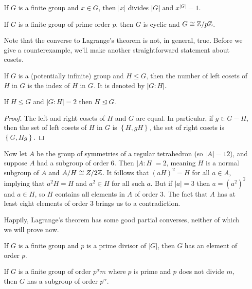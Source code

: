 \documentclass[../m171main.tex]{subfiles}
\begin{document}
\begin{corollary}[]
    If $G$ is a finite group and $x \in G$, then $|x|$ divides $|G|$ and $x^{|G|} = 1$.
\end{corollary}

\begin{corollary}[]
    If $G$ is a finite group of prime order $p$, then $G$ is cyclic and $G \cong \mathbb{Z} / p\mathbb{Z}$.
\end{corollary}

Note that the converse to Lagrange's theorem is not, in general, true.
Before we give a counterexample, we'll make another straightforward statement about cosets.

\begin{definition}
    If $G$ is a (potentially infinite) group and $H \leq G$, then the number of left cosets of $H$ in $G$ is the index of $H$ in $G$.
    It is denoted by $|G : H|$.
\end{definition}

\begin{theorem}[]
    If $H \leq G$ and $|G : H| = 2$ then $H \trianglelefteq G$.
\end{theorem}

\begin{proof}
    The left and right cosets of $H$ and $G$ are equal.
    In particular, if $g \in G - H$, then the set of left cosets of $H$ in $G$ is $\left\{ H, gH \right\}$, the set of right cosets is $\left\{ G, Hg \right\}$.
\end{proof}

Now let $A$ be the group of symmetries of a regular tetrahedron (so $|A| = 12$), and suppose $A$ had a subgroup of order 6.
Then $|A : H| = 2$, meaning $H$ is a normal subgroup of $A$ and $A / H \cong Z / 2\mathbb{Z}$.
It follows that $(aH)^2 = H$ for all $a \in A$, implying that $a^2 H = H$ and $a^2 \in H$ for all such $a$.
But if $|a| = 3$ then $a = (a^2)^2$ and $a \in H$, so $H$ contains all elements in $A$ of order $3$.
The fact that $A$ has at least eight elements of order 3 brings us to a contradiction.

Happily, Lagrange's theorem has some good partial converses, neither of which we will prove now.

\begin{theorem}
    If $G$ is a finite group and $p$ is a prime divisor of $|G|$, then $G$ has an element of order $p$.
\end{theorem}

\begin{theorem}
    If $G$ is a finite group of order $p^{\alpha} m$ where $p$ is prime and $p$ does not divide $m$, then $G$ has a subgroup of order $p^{\alpha}$.
\end{theorem}
\end{document}
